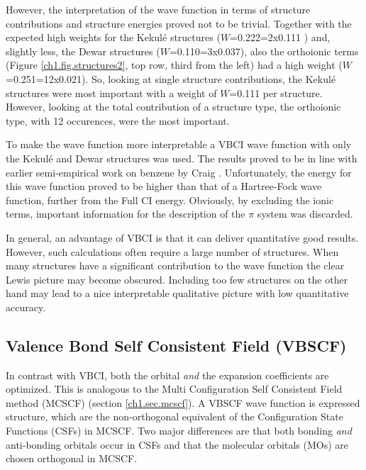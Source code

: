 However, the interpretation of the wave function in terms of structure contributions and structure energies proved not  to be trivial. Together with the expected high weights for the Kekul\'{e} structures ($W$=0.222=2x0.111 \cite{vbci175_2}) and, slightly less, the Dewar structures ($W$=0.110=3x0.037), also the orthoionic terms (Figure \ref{ch1.fig.structures2}, top row, third from the left) had a high weight ($W$=0.251=12x0.021). So, looking at single structure contributions, the Kekul\'e structures were most important with a weight of $W$=0.111 per structure. However, looking at the total contribution of a structure type, the orthoionic type, with 12 occurences, were the most important.

To make the wave function more interpretable a VBCI wave function with only the Kekul\'{e} and Dewar structures was used. The results proved to be in line with earlier semi-empirical work on benzene by Craig \cite{craig}. Unfortunately, the energy for this wave function proved to be higher than that of a Hartree-Fock wave function, further from the Full CI energy. Obviously, by excluding the ionic terms, important information for the description of the $\pi$ system was discarded.

In general, an advantage of VBCI is that it can deliver quantitative good results. However, such calculations often require a large number of structures. When many structures have a significant contribution to the wave function the clear Lewis picture may become obscured. Including too few structures on the other hand may lead to a nice interpretable qualitative picture with low quantitative accuracy. 

\subsection{\label{ch1.sec.vbscf}Valence Bond Self Consistent Field (VBSCF)}

In contrast with VBCI, both the orbital \textit{and} the expansion coefficients are optimized. This is analogous to the Multi Configuration Self Consistent Field method (MCSCF) (section \ref{ch1.sec.mcscf}). A VBSCF wave function is  expressed structure, which are the non-orthogonal equivalent of the Configuration State Functions (CSFs) in MCSCF.  Two major differences are that both bonding \textit{and} anti-bonding orbitals occur in CSFs and that the molecular orbitals (MOs) are chosen orthogonal in MCSCF.

